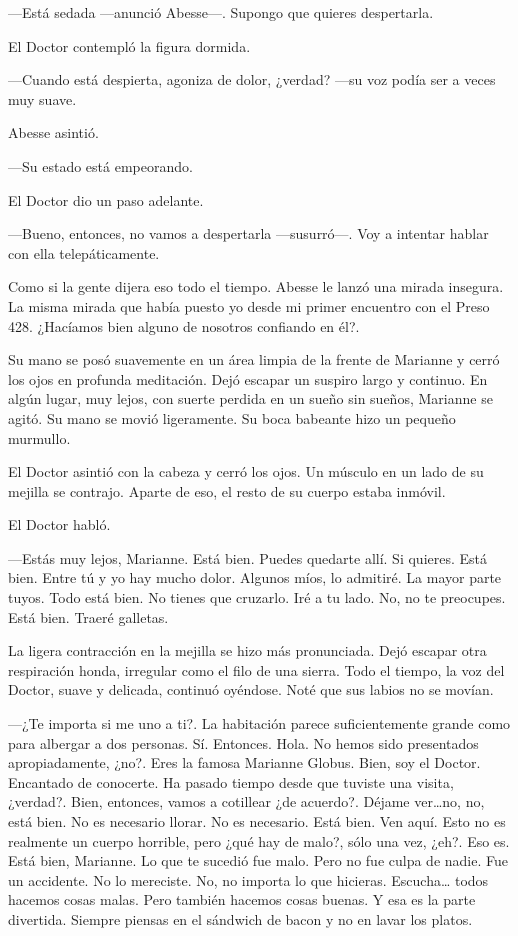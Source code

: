 ---Está sedada ---anunció Abesse---. Supongo que quieres despertarla.

El Doctor contempló la figura dormida.

---Cuando está despierta, agoniza de dolor, ¿verdad? ---su voz podía ser
a veces muy suave.

Abesse asintió.

---Su estado está empeorando.

El Doctor dio un paso adelante.

---Bueno, entonces, no vamos a despertarla ---susurró---. Voy a intentar
hablar con ella telepáticamente.

Como si la gente dijera eso todo el tiempo. Abesse le lanzó una mirada
insegura. La misma mirada que había puesto yo desde mi primer encuentro
con el Preso 428. ¿Hacíamos bien alguno de nosotros confiando en él?.

Su mano se posó suavemente en un área limpia de la frente de Marianne y
cerró los ojos en profunda meditación. Dejó escapar un suspiro largo y
continuo. En algún lugar, muy lejos, con suerte perdida en un sueño sin
sueños, Marianne se agitó. Su mano se movió ligeramente. Su boca
babeante hizo un pequeño murmullo.

El Doctor asintió con la cabeza y cerró los ojos. Un músculo en un lado
de su mejilla se contrajo. Aparte de eso, el resto de su cuerpo estaba
inmóvil.

El Doctor habló.

---Estás muy lejos, Marianne. Está bien. Puedes quedarte allí. Si
quieres. Está bien. Entre tú y yo hay mucho dolor. Algunos míos, lo
admitiré. La mayor parte tuyos. Todo está bien. No tienes que cruzarlo.
Iré a tu lado. No, no te preocupes. Está bien. Traeré galletas.

La ligera contracción en la mejilla se hizo más pronunciada. Dejó
escapar otra respiración honda, irregular como el filo de una sierra.
Todo el tiempo, la voz del Doctor, suave y delicada, continuó oyéndose.
Noté que sus labios no se movían.

---¿Te importa si me uno a ti?. La habitación parece suficientemente
grande como para albergar a dos personas. Sí. Entonces. Hola. No hemos
sido presentados apropiadamente, ¿no?. Eres la famosa Marianne Globus.
Bien, soy el Doctor. Encantado de conocerte. Ha pasado tiempo desde que
tuviste una visita, ¿verdad?. Bien, entonces, vamos a cotillear ¿de
acuerdo?. Déjame ver\ldots{}no, no, está bien. No es necesario llorar.
No es necesario. Está bien. Ven aquí. Esto no es realmente un cuerpo
horrible, pero ¿qué hay de malo?, sólo una vez, ¿eh?. Eso es. Está bien,
Marianne. Lo que te sucedió fue malo. Pero no fue culpa de nadie. Fue un
accidente. No lo mereciste. No, no importa lo que hicieras.
Escucha\ldots{} todos hacemos cosas malas. Pero también hacemos cosas
buenas. Y esa es la parte divertida. Siempre piensas en el sándwich de
bacon y no en lavar los platos.

